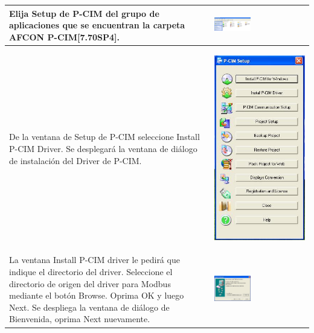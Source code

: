 \begin{table}[H]
\small
\centering
\renewcommand*{\arraystretch}{0.3}
\begin{tabular}{*{2}{m{}}}
\hline
  Elija Setup de P-CIM del grupo de aplicaciones que se encuentran la carpeta 
  AFCON P-CIM[7.70SP4]. 
  &\begin{center}
    \includegraphics[width=0.4\textwidth]
	{Cap5-SCADA/images/Dibujo1.JPG}
  \end{center}\\
\hline
  De la ventana de Setup de P-CIM seleccione Install P-CIM Driver.
  Se desplegará la ventana de diálogo de instalación del Driver de P-CIM.
  &\begin{center}
    \includegraphics[height=0.3\textwidth]
	{Cap5-SCADA/images/PcimSetup.jpeg}
  \end{center}\\
\hline
  La ventana Install P-CIM driver le pedirá que indique el directorio del
  driver. Seleccione el directorio de origen del driver para Modbus mediante 
  el botón Browse. 
  Oprima OK y luego Next. Se despliega la ventana de diálogo de Bienvenida, 
  oprima Next nuevamente.
  &\begin{center}
    \includegraphics[width=0.4\textwidth]
    {Cap5-SCADA/images/installDriver.jpeg}

\end{center}
\end{tabular}
\end{table}
